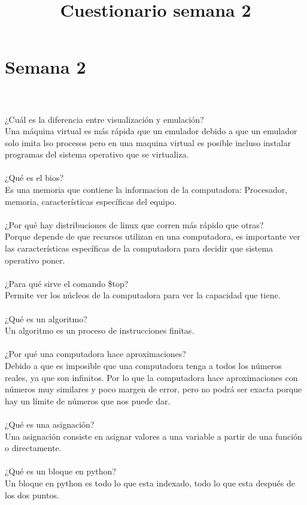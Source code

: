 \documentclass{book}
\begin{document}
	\section{Semana 2}
	\title{\Huge Cuestionario semana 2} \\
	\\
	¿Cuál es la diferencia entre visualización y emulación?\\
	Una máquina virtual es más rápida que un emulador
	debido a que un emulador solo imita lso procesos pero en una maquina virtual
	es posible incluso instalar programas del sistema operativo que se virtualiza.\\
	\\
	¿Qué es el bios?\\
	Es una memoria que contiene la informacion de la computadora: Procesador, memoria, características específicas
	del equipo.\\
	\\
	¿Por qué hay distribuciones de linux que corren más rápido que otras?\\
	Porque depende de que recursos utilizan en una computadora, es importante ver las características específicas de la computadora para decidir que sistema operativo poner.\\
	\\
	¿Para qué sirve el comando \$top?\\
	Permite ver los núcleos de la computadora para ver la capacidad que tiene.\\
	\\
	¿Qué es un algoritmo?\\
	Un algoritmo es un proceso de instrucciones finitas.\\
	\\
	¿Por qué una computadora hace aproximaciones?\\
	Debido a que es imposible que una computadora tenga a todos los números reales, ya que son infinitos. Por lo que la computadora hace aproximaciones con números muy similares y poco margen de error, pero no podrá ser exacta porque hay un límite de números que nos puede dar.\\
	\\
	¿Qué es una asignación?\\
	Una asignación consiste en asignar valores a una variable a partir de una función o directamente.\\
	\\
	¿Qué es un bloque en python?\\
	Un bloque en python es todo lo que esta indexado, todo lo que esta después de los dos puntos.\\
\end{document}

